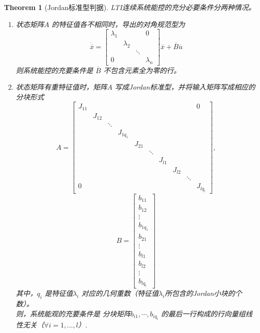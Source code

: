 \documentclass[14pt,a4paper]{article}
\theoremstyle{plain}
\newtheorem{thm}{Theorem}[section]
\theoremstyle{definition}
\theoremstyle{remark}
\theoremstyle{plain}
\theoremstyle{plain}
\theoremstyle{plain}
\theoremstyle{definition}
\theoremstyle{remark}
\numberwithin{equation}{section}
\begin{document}
				\begin{thm}[Jordan标准型判据]  
				\label{the:jordan标准型判据}
					LTI连续系统能控的\emph{充分必要}条件分两种情况。
					\begin{enumerate}[(1)]
						\item 状态矩阵$A$ 的特征值各不相同时，导出的对角规范型为
							\[
								\dot{ \overline{x}} = \begin{bmatrix}
								\lambda_1 & & & 0\\
										  & \lambda_2 & &\\
								&&\ddots &\\
								0 &&& \lambda_{n}
							\end{bmatrix} \overline{x} + \overline{B} \overline{u}
							\]
							则系统能控的充要条件是 $\overline{B}$ 不包含元素全为零的行。
						\item 状态矩阵有重特征值时，矩阵$A$ 写成Jordan标准型，并将输入矩阵写成相应的分块形式
							\[
							A = \begin{bmatrix}
								J_{11} &&&&&&&&&0 \\
									   & J_{12} &&&&&&&&\\
									   &&\ddots &&&&&&&\\
									   &&&J_{1 q_1} &&&&&&\\
									   &&&&J_{21}&&&&&\\
									   &&&&&\ddots &&&&\\
									   &&&&&&J_{l 1}&&&\\
									   &&&&&&&J_{l 2}&&\\
									   &&&&&&&&\ddots & \\
										0&&&&&&&&&J_{l q_l}
							\end{bmatrix} 
							,\] 
							\[
							B = \begin{bmatrix}
								b_{11}\\
								b_{12}\\
								\vdots\\
								b_{1q_1}\\
								b_{21}\\
								\vdots\\
								b_{l 1}\\
								b_{l 2}\\ 
								\vdots\\
								b_{lq_l}
							\end{bmatrix} 
							\]
							其中，$q_{i}$ 是特征值$\lambda_{i}$ 对应的几何重数（特征值$\lambda_{i}$所包含的Jordan小块的个数）。\\
							则，系统能观的充要条件是 分块矩阵$b_{i 1}, \cdots ,b_{iq_{i}}$ 的最后一行构成的行向量组线性无关（$\forall i=1,\ldots ,l$）. 
					\end{enumerate}
				\end{thm} 
\end{document}
